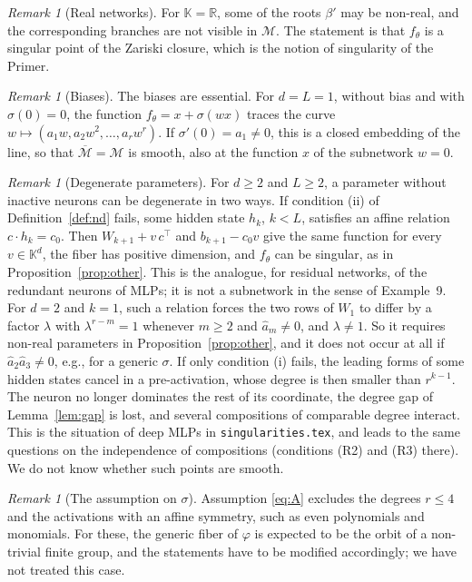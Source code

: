 \documentclass[11pt]{article}
\theoremstyle{definition}
\theoremstyle{remark}
\newtheorem{remark}[lemma]{Remark}
\newcommand{\K}{\mathbb{K}}
\newcommand{\R}{\mathbb{R}}
\newcommand{\M}{\mathcal{M}}
\newcommand{\Mbar}{\overline{\M}}
\newcommand{\ha}{\hat a}
\begin{document}
\begin{remark}[Real networks]
For $\K=\R$, some of the roots $\beta'$ may be non-real, and the corresponding branches are not visible in $\M$. The statement is that $f_\theta$ is a singular point of the Zariski closure, which is the notion of singularity of the Primer.
\end{remark}

\begin{remark}[Biases]
The biases are essential. For $d=L=1$, without bias and with $\sigma(0)=0$, the function $f_\theta=x+\sigma(wx)$ traces the curve $w\mapsto(a_1w,a_2w^2,\dots,a_rw^r)$. If $\sigma'(0)=a_1\ne0$, this is a closed embedding of the line, so that $\Mbar=\M$ is smooth, also at the function $x$ of the subnetwork $w=0$.
\end{remark}

\begin{remark}[Degenerate parameters]\label{rem:open}
For $d\ge2$ and $L\ge2$, a parameter without inactive neurons can be degenerate in two ways. If condition (ii) of Definition~\ref{def:nd} fails, some hidden state $h_k$, $k<L$, satisfies an affine relation $c\cdot h_k=c_0$. Then $W_{k+1}+v\,c^\top$ and $b_{k+1}-c_0v$ give the same function for every $v\in\K^d$, the fiber has positive dimension, and $f_\theta$ can be singular, as in Proposition~\ref{prop:other}. This is the analogue, for residual networks, of the redundant neurons of MLPs; it is not a subnetwork in the sense of Example~9. For $d=2$ and $k=1$, such a relation forces the two rows of $W_1$ to differ by a factor $\lambda$ with $\lambda^{r-m}=1$ whenever $m\ge2$ and $\ha_m\ne0$, and $\lambda\ne1$. So it requires non-real parameters in Proposition~\ref{prop:other}, and it does not occur at all if $\ha_2\ha_3\ne0$, e.g., for a generic $\sigma$. If only condition (i) fails, the leading forms of some hidden states cancel in a pre-activation, whose degree is then smaller than $r^{k-1}$. The neuron no longer dominates the rest of its coordinate, the degree gap of Lemma~\ref{lem:gap} is lost, and several compositions of comparable degree interact. This is the situation of deep MLPs in \texttt{singularities.tex}, and leads to the same questions on the independence of compositions (conditions \textup{(R2)} and \textup{(R3)} there). We do not know whether such points are smooth.
\end{remark}

\begin{remark}[The assumption on $\sigma$]
Assumption \eqref{eq:A} excludes the degrees $r\le4$ and the activations with an affine symmetry, such as even polynomials and monomials. For these, the generic fiber of $\varphi$ is expected to be the orbit of a non-trivial finite group, and the statements have to be modified accordingly; we have not treated this case.
\end{remark}
\end{document}
